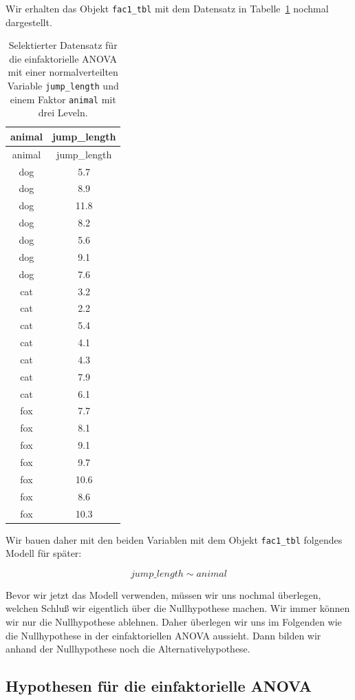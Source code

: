\documentclass[
  letterpaper,
  DIV=11,
  oneside]{scrreport}
\begin{document}
Wir erhalten das Objekt \texttt{fac1\_tbl} mit dem Datensatz in
Tabelle~\ref{tbl-data-anova-1} nochmal dargestellt.

\hypertarget{tbl-data-anova-1}{}
\begin{longtable}[]{@{}cc@{}}
\caption{\label{tbl-data-anova-1}Selektierter Datensatz für die
einfaktorielle ANOVA mit einer normalverteilten Variable
\texttt{jump\_length} und einem Faktor \texttt{animal} mit drei
Leveln.}\tabularnewline
\toprule()
animal & jump\_length \\
\midrule()
\endfirsthead
\toprule()
animal & jump\_length \\
\midrule()
\endhead
dog & 5.7 \\
dog & 8.9 \\
dog & 11.8 \\
dog & 8.2 \\
dog & 5.6 \\
dog & 9.1 \\
dog & 7.6 \\
cat & 3.2 \\
cat & 2.2 \\
cat & 5.4 \\
cat & 4.1 \\
cat & 4.3 \\
cat & 7.9 \\
cat & 6.1 \\
fox & 7.7 \\
fox & 8.1 \\
fox & 9.1 \\
fox & 9.7 \\
fox & 10.6 \\
fox & 8.6 \\
fox & 10.3 \\
\bottomrule()
\end{longtable}

Wir bauen daher mit den beiden Variablen mit dem Objekt
\texttt{fac1\_tbl} folgendes Modell für später:

\[
jump\_length \sim animal
\]

Bevor wir jetzt das Modell verwenden, müssen wir uns nochmal überlegen,
welchen Schluß wir eigentlich über die Nullhypothese machen. Wir immer
können wir nur die Nullhypothese ablehnen. Daher überlegen wir uns im
Folgenden wie die Nullhypothese in der einfaktoriellen ANOVA aussieht.
Dann bilden wir anhand der Nullhypothese noch die Alternativehypothese.

\hypertarget{hypothesen-fuxfcr-die-einfaktorielle-anova}{%
\subsection{Hypothesen für die einfaktorielle
ANOVA}\label{hypothesen-fuxfcr-die-einfaktorielle-anova}}
\end{document}
